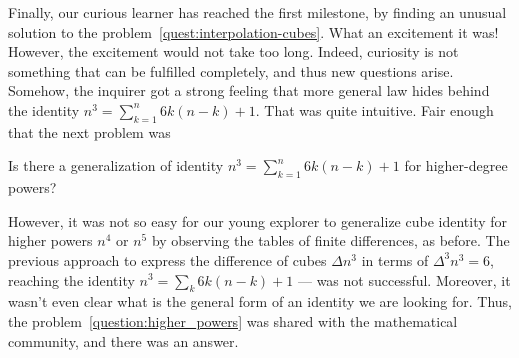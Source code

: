 Finally, our curious learner has reached the first milestone, by finding an
unusual solution to the problem~\eqref{quest:interpolation-cubes}.
What an excitement it was!
However, the excitement would not take too long.
Indeed, curiosity is not something that can be fulfilled completely,
and thus new questions arise.
Somehow, the inquirer got a strong feeling that more general
law hides behind the identity $n^3 = \sum_{k=1}^{n} 6k(n-k) + 1$.
That was quite intuitive.
Fair enough that the next problem was
\begin{problem}
    Is there a generalization of identity $n^3 = \sum_{k=1}^{n} 6k(n-k) + 1$ for higher-degree powers?
    \label{question:higher_powers}
\end{problem}

However, it was not so easy for our young explorer to generalize cube identity for higher powers $n^4$ or $n^5$
by observing the tables of finite differences, as before.
The previous approach to express the difference of cubes $\Delta n^3$ in terms of
$\Delta^3 n^3 = 6$, reaching the identity $n^3 = \sum_k 6k (n-k) +1$ --- was not successful.
Moreover, it wasn't even clear what is the general form of an identity we are looking for.
Thus, the problem~\eqref{question:higher_powers} was shared with the mathematical community,
and there was an answer.
